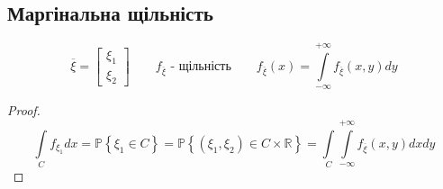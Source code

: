 \documentclass[14pt,a4paper]{scrartcl}
\theoremstyle{definition}
\theoremstyle{remark}
\theoremstyle{definition}
\theoremstyle{definition}
\begin{document}
\subsection{Маргінальна щільність}
$$
\overline{\xi}  = \begin{bmatrix}
  \xi_1 \\ \xi_2
\end{bmatrix}
\qquad f_{ \overline{ \xi}} \text{ - щільність} \qquad f_{ \overline{ \xi}} (x) =  \int\limits_{- \infty}^{ +\infty}{ f_{ \overline{\xi}}(x,y)dy}
$$

\begin{proof}
$$ \int\limits_{C}^{}{f_{ \xi_1} dx}=
\mathbb{P} \left\lbrace \xi_1 \in C \right\rbrace = \mathbb{P} \left\lbrace ( \xi_1 , \xi_2 ) \in C \times \mathbb{R} \right\rbrace =  \int\limits_{C}^{}{   \int\limits_{-\infty}^{ +\infty}{ f_{ \overline{\xi}}(x,y) dxdy}}$$
\end{proof}
\end{document}
